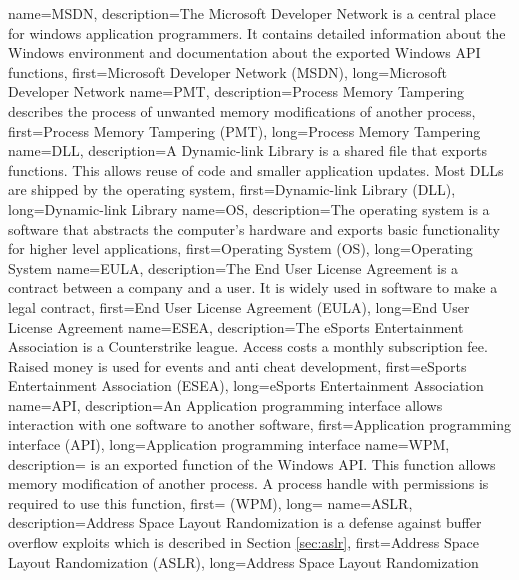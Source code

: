 {
  name={MSDN},
  description={The Microsoft Developer Network is a central place for windows application programmers. It contains detailed information about the Windows environment and documentation about the exported Windows API functions},
  first={Microsoft Developer Network (MSDN)},
  long={Microsoft Developer Network}
}
{
  name={PMT},
  description={Process Memory Tampering describes the process of unwanted memory modifications of another process},
  first={Process Memory Tampering (PMT)},
  long={Process Memory Tampering}
}
{
  name={DLL},
  description={A Dynamic-link Library is a shared file that exports functions. This allows reuse of code and smaller application updates. Most DLLs are shipped by the operating system},
  first={Dynamic-link Library (DLL)},
  long={Dynamic-link Library}
}
{
  name={OS},
  description={The operating system is a software that abstracts the computer's hardware and exports basic functionality for higher level applications},
  first={Operating System (OS)},
  long={Operating System}
}
{
  name={EULA},
  description={The End User License Agreement is a contract between a company and a user. It is widely used in software to make a legal contract},
  first={End User License Agreement (EULA)},
  long={End User License Agreement}
}
{
  name={ESEA},
  description={The eSports Entertainment Association is a Counterstrike league. Access costs a monthly subscription fee. Raised money is used for events and anti cheat development},
  first={eSports Entertainment Association (ESEA)},
  long={eSports Entertainment Association}
}
{
  name={API},
  description={An Application programming interface allows interaction with one software to another software},
  first={Application programming interface (API)},
  long={Application programming interface}
}
{
  name={WPM},
  description={ is an exported function of the Windows API. This function allows memory modification of another process. A process handle with  permissions is required to use this function},
  first={ (WPM)},
  long={}
}
{
  name={ASLR},
  description={Address Space Layout Randomization is a defense against buffer overflow exploits which is described in Section \ref{sec:aslr}},
  first={Address Space Layout Randomization (ASLR)},
  long={Address Space Layout Randomization}
}
